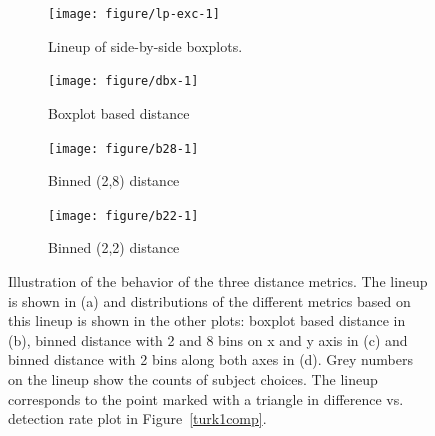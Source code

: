 \documentclass[12pt]{article}\usepackage[]{graphicx}\usepackage[]{color}
\newenvironment{knitrout}{}{} %
\begin{document}
\begin{figure}[!p]
\centering
\begin{subfigure}[t]{\textwidth}
\centering
\caption{\label{fig:turk1-exp-1}Lineup of side-by-side boxplots. }
\begin{knitrout}
\color{fgcolor}
\texttt{[image: figure/lp-exc-1]} 

\end{knitrout}
\end{subfigure}\hfill




\begin{subfigure}[t]{0.32\textwidth}
\caption{\small Boxplot based distance}
\begin{knitrout}
\color{fgcolor}
\texttt{[image: figure/dbx-1]} 

\end{knitrout}
\end{subfigure}
\begin{subfigure}[t]{0.32\textwidth}
\caption{\small Binned (2,8) distance}
\begin{knitrout}
\color{fgcolor}
\texttt{[image: figure/b28-1]} 

\end{knitrout}
\end{subfigure}
\begin{subfigure}[t]{0.32\textwidth}
\caption{\small Binned (2,2) distance}
\begin{knitrout}
\color{fgcolor}
\texttt{[image: figure/b22-1]} 

\end{knitrout}
\end{subfigure}

	\vspace{-.1in}
\caption{Illustration of the behavior of the three distance metrics. The lineup is shown in (a) and  distributions of the different  metrics based on this lineup is shown in the other plots: boxplot based distance in (b), binned distance with 2 and 8 bins on x and y axis in (c) and binned distance with 2 bins along both axes in (d). Grey numbers on the lineup show the counts of subject choices. The lineup corresponds to the point marked with a triangle in difference vs. detection rate plot in Figure~\ref{turk1comp}. }
\label{turk1-exp}
\end{figure}
\end{document}
